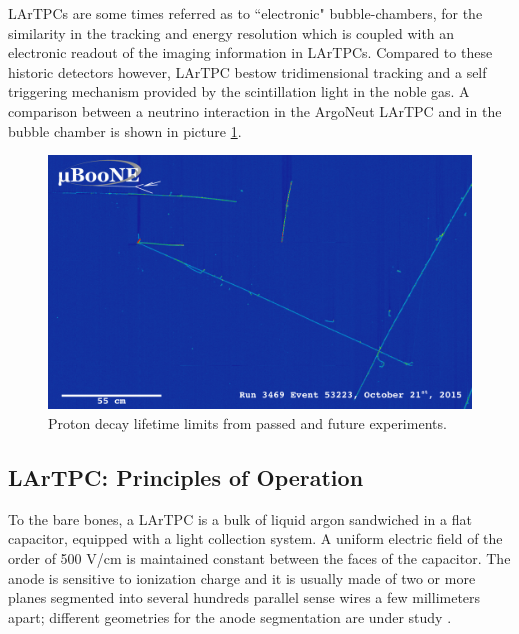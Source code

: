 LArTPCs are some times referred as to ``electronic" bubble-chambers, for the similarity in the tracking and energy resolution which is coupled with an electronic readout of the imaging information in LArTPCs. Compared to these historic detectors however, LArTPC bestow tridimensional tracking and a self triggering mechanism provided by the scintillation light in the noble gas.  A comparison between a neutrino interaction in the ArgoNeut LArTPC and in the bubble chamber is shown in picture \ref{fig:NuEvd}.
\begin{figure}[hbpt]
\centering
\includegraphics[width=6.5in]{Chapter-2/Images/run3469_subrun1064_event53223_col.pdf}
\caption{Proton decay lifetime limits from passed and future experiments.}
\label{fig:NuEvd}
\end{figure}



\subsection{LArTPC: Principles of Operation}\label{sec:LArTPCWorkingPrinciple}


To the bare bones, a LArTPC is a bulk of liquid argon sandwiched in a flat capacitor, equipped with a light collection system. A uniform electric field of the order of 500 V/cm is maintained constant between the faces of the capacitor. The anode is sensitive to ionization charge and it is usually made of two or more planes segmented into several hundreds parallel sense wires a few millimeters apart; different geometries for the anode segmentation are under study \cite{1748-0221-8-07-P07002}. 

